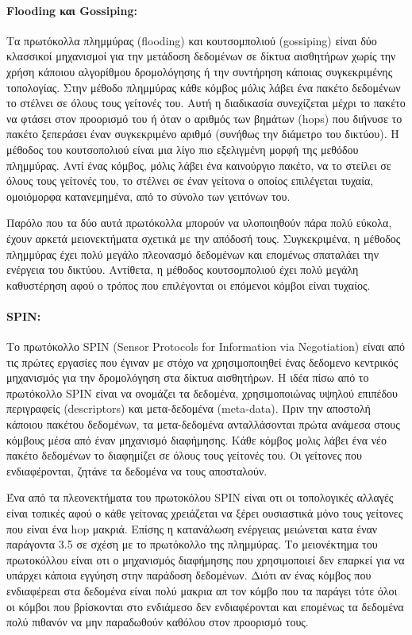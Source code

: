\paragraph{Flooding και Gossiping:} Τα πρωτόκολλα πλημμύρας (flooding) και κουτσομπολιού (gossiping) \cite{gossiping} είναι δύο κλασσικοί μηχανισμοί για την μετάδοση
δεδομένων σε δίκτυα αισθητήρων χωρίς την χρήση κάποιου αλγορίθμου δρομολόγησης ή την συντήρηση κάποιας συγκεκριμένης τοπολογίας.
Στην μέθοδο πλημμύρας κάθε κόμβος μόλις λάβει ένα πακέτο δεδομένων το στέλνει σε όλους τους γείτονές του. Αυτή η διαδικασία συνεχίζεται μέχρι το πακέτο να φτάσει
στον προορισμό του ή όταν ο αριθμός των βημάτων (hops) που διήνυσε το πακέτο ξεπεράσει έναν συγκεκριμένο αριθμό (συνήθως την διάμετρο του δικτύου). Η μέθοδος του
κουτσοπολιού είναι μια λίγο πιο εξελιγμένη μορφή της μεθόδου πλημμύρας. Αντί ένας κόμβος, μόλις λάβει ένα καινούργιο πακέτο, να το στείλει σε όλους τους γείτονές του,
το στέλνει σε έναν γείτονα ο οποίος επιλέγεται τυχαία, ομοιόμορφα κατανεμημένα, από το σύνολο των γειτόνων του.

Παρόλο που τα δύο αυτά πρωτόκολλα μπορούν να υλοποιηθούν πάρα πολύ εύκολα, έχουν αρκετά μειονεκτήματα σχετικά με την απόδοσή τους. Συγκεκριμένα, η μέθοδος
πλημμύρας έχει πολύ μεγάλο πλεονασμό δεδομένων και επομένως σπαταλάει την ενέργεια του δικτύου. Αντίθετα, η μέθοδος κουτσομπολιού έχει πολύ μεγάλη καθυστέρηση αφού ο
τρόπος που επιλέγονται οι επόμενοι κόμβοι είναι τυχαίος.

\paragraph{SPIN:} Το πρωτόκολλο SPIN (Sensor Protocols for Information via Negotiation) \cite{spin_protocol} είναι από τις πρώτες εργασίες που έγιναν με στόχο να
χρησιμοποιηθεί ένας δεδομενο κεντρικός μηχανισμός για την δρομολόγηση στα δίκτυα αισθητήρων. Η ιδέα πίσω από το πρωτόκολλο SPIN είναι να ονομάζει τα δεδομένα,
χρησιμοποιώνας υψηλού επιπέδου περιγραφείς (descriptors) και μετα-δεδομένα (meta-data). Πριν την αποστολή κάποιου πακέτου δεδομένων, τα μετα-δεδομένα ανταλλάσονται
πρώτα ανάμεσα στους κόμβους μέσα από έναν μηχανισμό διαφήμησης. Κάθε κόμβος μολις λάβει ένα νέο πακέτο δεδομένων το διαφημίζει σε όλους τους γείτονές του. Οι γείτονες
που ενδιαφέρονται, ζητάνε τα δεδομένα να τους αποσταλούν.

Ένα από τα πλεονεκτήματα του πρωτοκόλου SPIN είναι οτι οι τοπολογικές αλλαγές είναι τοπικές αφού ο κάθε γείτονας χρειάζεται να ξέρει ουσιαστικά μόνο τους γείτονες
που είναι ένα hop μακριά. Επίσης η κατανάλωση ενέργειας μειώνεται κατα έναν παράγοντα 3.5 \cite{spin_protocol} σε σχέση με το πρωτόκολλο της πλημμύρας. Το μειονέκτημα
του πρωτοκόλλου είναι οτι ο μηχανισμός διαφήμησης που χρησιμοποιεί δεν επαρκεί για να υπάρχει κάποια εγγύηση στην παράδοση δεδομένων. Διότι αν ένας κόμβος
που ενδιαφέρεαι στα δεδομένα είναι πολύ μακρια απ τον κόμβο που τα παράγει τότε όλοι οι κόμβοι που βρίσκονται στο ενδιάμεσο δεν ενδιαφέρονται και επομένως τα δεδομένα
πολύ πιθανόν να μην παραδωθούν καθόλου στον προορισμό τους.


